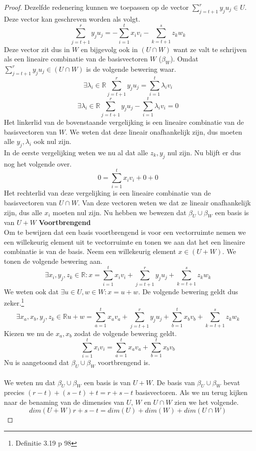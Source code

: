\documentclass[lineaire_algebra_oplossingen.tex]{subfiles}
\begin{document}
\begin{proof}
Dezelfde redenering kunnen we toepassen op de vector $\sum_{j=t+1}^ry_ju_j \in U$. Deze vector kan geschreven worden als volgt.
\[
\sum_{j=t+1}^ry_ju_j= -\sum_{i=1}^tx_iv_i - \sum_{k=t+1}^sz_kw_k
\]
Deze vector zit dus in $W$ en bijgevolg ook in $(U\cap W)$ want ze valt te schrijven als een lineaire combinatie van de basisvectoren $W$ ($\beta_W$). Omdat $\sum_{j=t+1}^ry_ju_j \in (U\cap W)$ is de volgende bewering waar.
\[
\exists \lambda_i \in \mathbb{R} \sum_{j=t+1}^ry_ju_j = \sum_{i=1}^t\lambda_iv_i
\]
\[
\exists \lambda_i \in \mathbb{R} \sum_{j=t+1}^ry_ju_j - \sum_{i=1}^t\lambda_iv_i = 0 
\]
Het linkerlid van de bovenstaande vergelijking is een lineaire combinatie van de basisvectoren van $W$. We weten dat deze lineair onafhankelijk zijn, dus moeten alle $y_j,  \lambda_i$ ook nul zijn.\\
In de eerste vergelijking weten we nu al dat alle $z_k,y_j$ nul zijn. Nu blijft er dus nog het volgende over.
\[
0 = \sum_{i=1}^tx_iv_i + 0 + 0
\]
Het rechterlid van deze vergelijking is een lineaire combinatie van de basisvectoren van $U\cap W$. Van deze vectoren weten we dat ze lineair onafhankelijk zijn, dus alle $x_i$ moeten nul zijn.
Nu hebben we bewezen dat $\beta_U\cup \beta_W$ een basis is van $U+W$
\textbf{Voortbrengend}\\
Om te bewijzen dat een basis voortbrengend is voor een vectorruimte nemen we een willekeurig element uit te vectorruimte en tonen we aan dat het een lineaire combinatie is van de basis.
Neem een willekeurig element $x \in (U + W)$. We tonen de volgende bewering aan.
\[
\exists x_i,y_j,z_k \in \mathbb{R}: x = \sum_{i=1}^tx_iv_i + \sum_{j=t+1}^ry_ju_j + \sum_{k=t+1}^sz_kw_k
\]
We weten ook dat $\exists u\in U, w\in W: x = u+w$. De volgende bewering geldt dus zeker.\footnote{Definitie 3.19 p 98}
\[
\exists x_a,x_b,y_j,z_k \in \mathbb{R}  u+w = \sum_{a=1}^tx_av_a + \sum_{j=t+1}^ry_ju_j + \sum_{b=1}^tx_bv_b + \sum_{k=t+1}^sz_kw_k
\]
Kiezen we nu de $x_a,x_b$ zodat de volgende bewering geldt.
\[
\sum_{i=1}^tx_iv_i = \sum_{a=1}^tx_av_a + \sum_{b=1}^tx_bv_b 
\]
Nu is aangetoond dat $\beta_U \cup \beta_W$ voortbrengend is.
\\\\ 
We weten nu dat $\beta_U \cup \beta_W$ een basis is van $U+W$. De basis van $\beta_U \cup \beta_W$ bevat precies $(r-t)+(s-t)+t = r+s-t$ basisvectoren. Als we nu terug kijken naar de benaming van de dimensies van $U$, $W$ en $U\cap W$ zien we het volgende.
\[
dim(U+W) r+s-t = dim(U) + dim(W) + dim(U \cap W)
\]
\end{proof}
\end{document}
